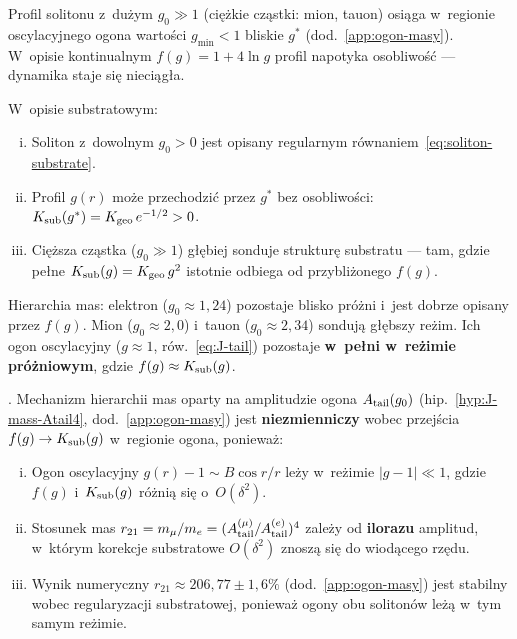 \begin{remark}%
\label{rem:heavy-solitons-substrate}
Profil solitonu z~dużym $g_0 \gg 1$ (ciężkie cząstki: mion, tauon)
osiąga w~regionie oscylacyjnego ogona wartości
$g_{\min} < 1$ bliskie $g^*$ (dod.~\ref{app:ogon-masy}).
W~opisie kontinualnym $f(g) = 1 + 4\ln g$ profil napotyka
osobliwość --- dynamika staje się nieciągła.

W~opisie substratowym:
\begin{enumerate}[(i)]
  \item Soliton z~dowolnym $g_0 > 0$ jest opisany
    regularnym równaniem~\eqref{eq:soliton-substrate}.
  \item Profil $g(r)$ może przechodzić przez $g^*$
    bez osobliwości: $K_{\rm sub}(g^*) = K_{\rm geo}\,e^{-1/2} > 0$.
  \item Cięższa cząstka ($g_0 \gg 1$) głębiej sonduje
    strukturę substratu --- tam, gdzie pełne $K_{\rm sub}(g) = K_{\rm geo}\,g^2$
    istotnie odbiega od przybliżonego $f(g)$.
\end{enumerate}

Hierarchia mas: elektron ($g_0 \approx 1{,}24$) pozostaje
blisko próżni i~jest dobrze opisany przez $f(g)$.
Mion ($g_0 \approx 2{,}0$) i~tauon ($g_0 \approx 2{,}34$)
sondują głębszy reżim. Ich ogon oscylacyjny ($g \approx 1$,
ró{}w.~\eqref{eq:J-tail}) pozostaje \textbf{w~pełni w~reżimie
próżniowym}, gdzie $f(g) \approx K_{\rm sub}(g)$.
\end{remark}

\begin{proposition}%
\label{prop:Atail-preserved}
.
Mechanizm hierarchii mas oparty na amplitudzie ogona
$A_{\rm tail}(g_0)$ (hip.~\ref{hyp:J-mass-Atail4},
dod.~\ref{app:ogon-masy}) jest \textbf{niezmienniczy}
wobec przejścia $f(g) \to K_{\rm sub}(g)$
w~regionie ogona, ponieważ:
\begin{enumerate}[(i)]
  \item Ogon oscylacyjny $g(r) - 1 \sim B\cos r/r$
    leży w~reżimie $|g - 1| \ll 1$, gdzie
    $f(g)$ i~$K_{\rm sub}(g)$ różnią się o~$O(\delta^2)$.
  \item Stosunek mas $r_{21} = m_\mu/m_e
    = (A_{\rm tail}^{(\mu)}/A_{\rm tail}^{(e)})^4$
    zależy od \textbf{ilorazu} amplitud,
    w~którym korekcje substratowe $O(\delta^2)$
    znoszą się do wiodącego rzędu.
  \item Wynik numeryczny $r_{21} \approx 206{,}77 \pm 1{,}6\%$
    (dod.~\ref{app:ogon-masy}) jest stabilny wobec
    regularyzacji substratowej, ponieważ
    ogony obu solitonów leżą w~tym samym reżimie.
\end{enumerate}
\end{proposition}

